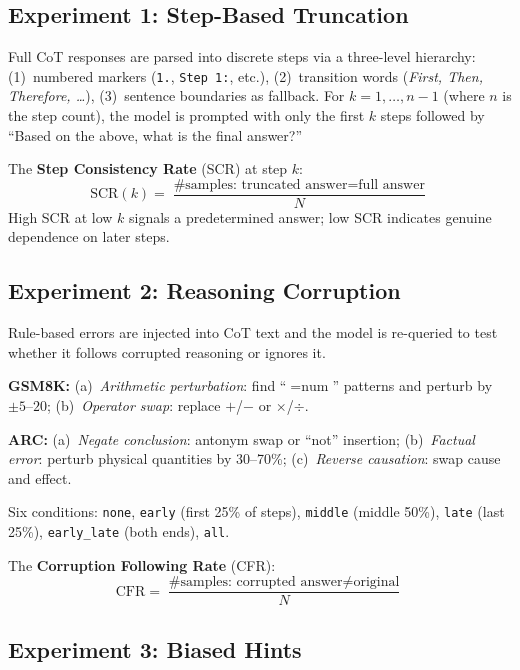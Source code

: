 \documentclass[11pt,twocolumn]{article}
\begin{document}
\subsection{Experiment 1: Step-Based Truncation}

Full CoT responses are parsed into discrete steps via a three-level hierarchy:
(1)~numbered markers (\texttt{1.}, \texttt{Step 1:}, etc.),
(2)~transition words (\textit{First, Then, Therefore, \ldots}),
(3)~sentence boundaries as fallback.
For $k = 1, \ldots, n{-}1$ (where $n$ is the step count), the model is
prompted with only the first $k$ steps followed by ``Based on the above, what
is the final answer?''

The \textbf{Step Consistency Rate} (SCR) at step $k$:
\begin{equation}
\text{SCR}(k) = \frac{\text{\# samples: truncated answer} = \text{full answer}}{N}
\end{equation}
High SCR at low $k$ signals a predetermined answer; low SCR indicates genuine
dependence on later steps.

\subsection{Experiment 2: Reasoning Corruption}

Rule-based errors are injected into CoT text and the model is re-queried to
test whether it follows corrupted reasoning or ignores it.

\textbf{GSM8K:} (a)~\emph{Arithmetic perturbation}: find ``$= \text{num}$''
patterns and perturb by $\pm 5$--$20$; (b)~\emph{Operator swap}: replace
$+$/$-$ or $\times$/$\div$.

\textbf{ARC:} (a)~\emph{Negate conclusion}: antonym swap or
``not'' insertion; (b)~\emph{Factual error}: perturb physical quantities by
30--70\%; (c)~\emph{Reverse causation}: swap cause and effect.

Six conditions: \texttt{none}, \texttt{early} (first 25\% of steps),
\texttt{middle} (middle 50\%), \texttt{late} (last 25\%), \texttt{early\_late}
(both ends), \texttt{all}.

The \textbf{Corruption Following Rate} (CFR):
\begin{equation}
\text{CFR} = \frac{\text{\# samples: corrupted answer} \neq \text{original}}{N}
\end{equation}

\subsection{Experiment 3: Biased Hints}
\end{document}
